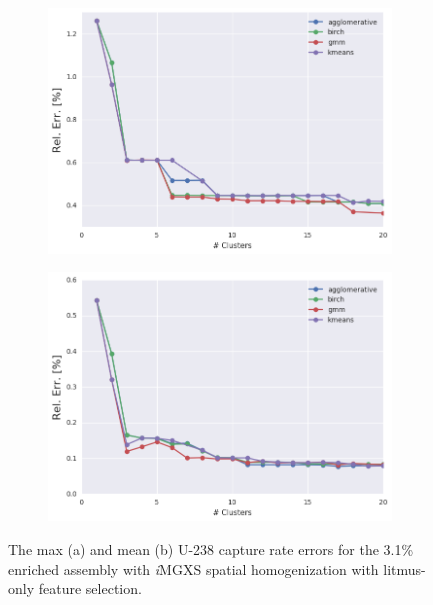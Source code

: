 \begin{figure}[h!]
\centering
\begin{subfigure}{0.9\textwidth}
  \centering
  \includegraphics[width=\linewidth]{figures/results/err-by-cluster/assm-31/max-rel-err}
  \caption{}
  \label{fig:chap11-max-capt-err-by-cluster-assm-31}
\end{subfigure}
\begin{subfigure}{0.9\textwidth}
  \centering
  \includegraphics[width=\linewidth]{figures/results/err-by-cluster/assm-31/mean-rel-err}
  \caption{}
  \label{fig:chap11-mean-capt-err-by-cluster-assm-31}
\end{subfigure}
\caption[U-238 capture rate errors for the 3.1\% enriched assembly]{The max (a) and mean (b) U-238 capture rate errors for the 3.1\% enriched assembly with \textit{i}\ac{MGXS} spatial homogenization with litmus-only feature selection.}
\label{fig:chap11-capt-err-by-cluster-assm-31}
\end{figure}

